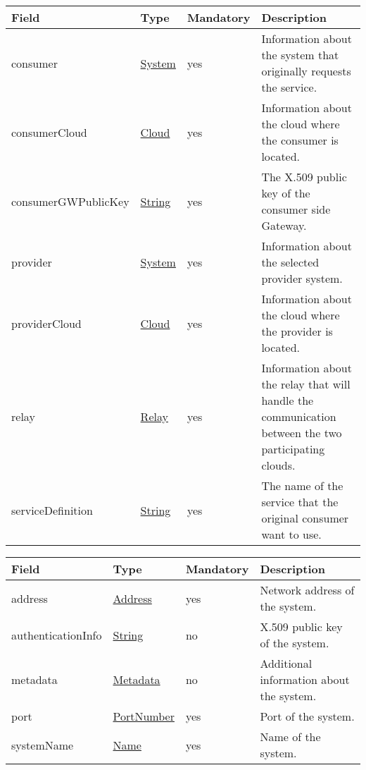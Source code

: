\documentclass[a4paper]{arrowhead}
\newcommand{\pref}[1]{{\textcolor{ArrowheadGrey}{\hyperref[sec:model:primitives:#1]{#1}}}}
\begin{document}
\begin{table}[ht!]
\begin{tabularx}{\textwidth}{| p{3.6cm} | p{3cm} | p{2cm} | X |} \hline
\rowcolor{gray!33} Field & Type & Mandatory & Description \\ \hline
consumer & \hyperref[sec:model:System]{System} & yes & Information about the system that originally requests the service. \\ \hline
consumerCloud & \hyperref[sec:model:Cloud]{Cloud} & yes & Information about the cloud where the consumer is located. \\ \hline
consumerGWPublicKey & \pref{String} & yes & The X.509 public key of the consumer side Gateway.  \\ \hline
provider & \hyperref[sec:model:System]{System} & yes & Information about the selected provider system. \\ \hline
providerCloud & \hyperref[sec:model:Cloud]{Cloud} & yes & Information about the cloud where the provider is located. \\ \hline
relay & \hyperref[sec:model:Relay]{Relay} & yes & Information about the relay that will handle the communication between the two participating clouds. \\ \hline
serviceDefinition & \pref{String} & yes & The name of the service that the original consumer want to use. \\ \hline

\end{tabularx}
\end{table}

\label{sec:model:System}

\begin{table}[ht!]
\begin{tabularx}{\textwidth}{| p{4cm} | p{4cm} | p{2cm} | X |} \hline
\rowcolor{gray!33} Field & Type & Mandatory & Description \\ \hline

address &\pref{Address} & yes & Network address of the system. \\ \hline
authenticationInfo &\pref{String} & no & X.509 public key of the system. \\ \hline
metadata &\hyperref[sec:model:Metadata]{Metadata} & no & Additional information about the system. \\ \hline
port &\pref{PortNumber} & yes & Port of the system. \\ \hline
systemName &\pref{Name} & yes & Name of the system. \\ \hline
\end{tabularx}
\end{table}
\end{document}
